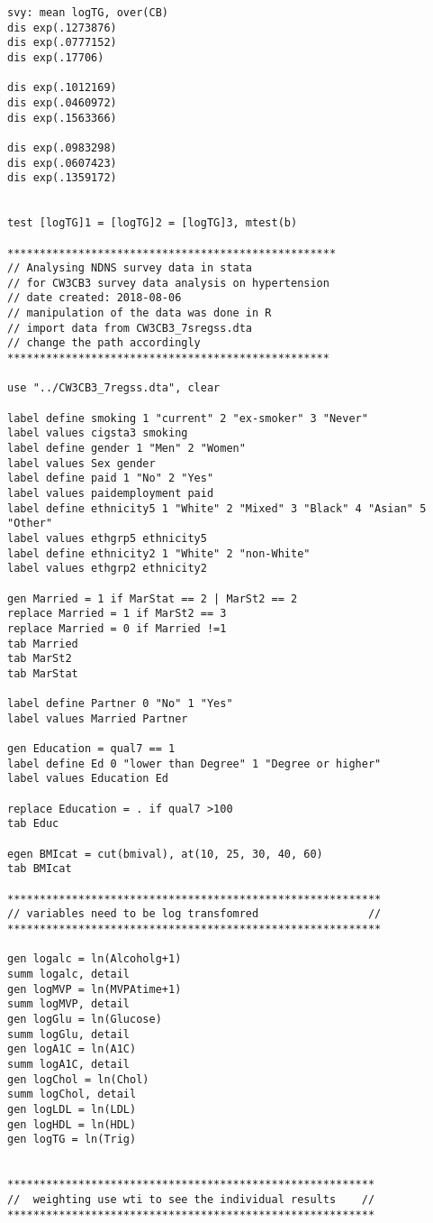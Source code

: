 \begin{verbatim}
svy: mean logTG, over(CB)
dis exp(.1273876)
dis exp(.0777152)
dis exp(.17706)

dis exp(.1012169)  
dis exp(.0460972)
dis exp(.1563366)

dis exp(.0983298)
dis exp(.0607423)
dis exp(.1359172)


test [logTG]1 = [logTG]2 = [logTG]3, mtest(b)

***************************************************
// Analysing NDNS survey data in stata
// for CW3CB3 survey data analysis on hypertension
// date created: 2018-08-06
// manipulation of the data was done in R
// import data from CW3CB3_7sregss.dta
// change the path accordingly
**************************************************

use "../CW3CB3_7regss.dta", clear

label define smoking 1 "current" 2 "ex-smoker" 3 "Never"
label values cigsta3 smoking
label define gender 1 "Men" 2 "Women"
label values Sex gender
label define paid 1 "No" 2 "Yes"
label values paidemployment paid
label define ethnicity5 1 "White" 2 "Mixed" 3 "Black" 4 "Asian" 5 "Other"
label values ethgrp5 ethnicity5
label define ethnicity2 1 "White" 2 "non-White"
label values ethgrp2 ethnicity2

gen Married = 1 if MarStat == 2 | MarSt2 == 2 
replace Married = 1 if MarSt2 == 3
replace Married = 0 if Married !=1
tab Married
tab MarSt2
tab MarStat

label define Partner 0 "No" 1 "Yes"
label values Married Partner

gen Education = qual7 == 1
label define Ed 0 "lower than Degree" 1 "Degree or higher"
label values Education Ed

replace Education = . if qual7 >100
tab Educ

egen BMIcat = cut(bmival), at(10, 25, 30, 40, 60)
tab BMIcat

**********************************************************
// variables need to be log transfomred                 //
**********************************************************

gen logalc = ln(Alcoholg+1)
summ logalc, detail
gen logMVP = ln(MVPAtime+1)
summ logMVP, detail
gen logGlu = ln(Glucose)
summ logGlu, detail
gen logA1C = ln(A1C)
summ logA1C, detail
gen logChol = ln(Chol)
summ logChol, detail
gen logLDL = ln(LDL)
gen logHDL = ln(HDL)
gen logTG = ln(Trig)


*********************************************************
//  weighting use wti to see the individual results    //
*********************************************************



\end{verbatim}
